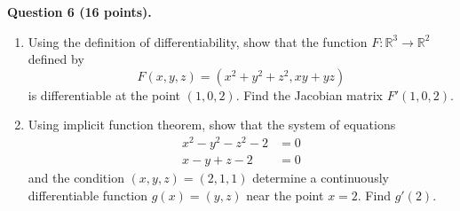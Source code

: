 \documentclass[11pt]{amsart}
\theoremstyle{plain}
\numberwithin{equation}{section}
\begin{document}
\noindent\textbf{Question 6 (16 points).}
\begin{enumerate}[label=\textbf{(\alph*)}]
    \itemsep 0em
    \item Using the definition of differentiability, show that the function $F:\mathbb{R}^{3}\longrightarrow\mathbb{R}^{2}$ defined by \[F(x,y,z)=\left(x^{2}+y^{2}+z^{2},xy+yz\right)\] is differentiable at the point $(1,0,2)$. Find the Jacobian matrix $F'(1,0,2)$.
    \item Using implicit function theorem, show that the system of equations 
\begin{align*}
    x^{2}-y^{2}-z^{2}-2&=0
    \\
    x-y+z-2&=0
\end{align*}
and the condition $(x,y,z)=(2,1,1)$ determine a continuously differentiable function $g(x)=(y,z)$ near the point $x=2$. Find $g'(2)$.
\end{enumerate}
\end{document}
